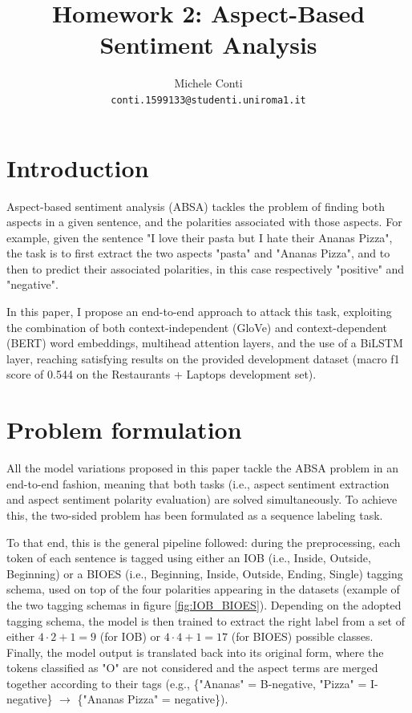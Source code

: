 \documentclass[11pt,a4paper]{article}
\title{Homework 2: Aspect-Based Sentiment Analysis}
\author{Michele Conti \\
	\texttt{conti.1599133@studenti.uniroma1.it}\\}
\date{}
\begin{document}
	\maketitle
	\section{Introduction}
	Aspect-based sentiment analysis (ABSA) tackles the problem of finding both aspects in a given sentence, and the polarities associated with those aspects. For example, given the sentence "I love their pasta but I hate their Ananas Pizza", the task is to first extract the two aspects "pasta" and "Ananas Pizza", and to then to predict their associated polarities, in this case respectively "positive" and "negative".
	
	In this paper, I propose an end-to-end approach to attack this task, exploiting the combination of both context-independent (GloVe) and context-dependent (BERT) word embeddings, multihead attention layers, and the use of a BiLSTM layer, reaching satisfying results on the provided development dataset (macro f1 score of 0.544 on the Restaurants + Laptops development set).
	
	\section{Problem formulation}
	All the model variations proposed in this paper tackle the ABSA problem in an end-to-end fashion, meaning that both tasks (i.e., aspect sentiment extraction and aspect sentiment polarity evaluation) are solved simultaneously. To achieve this, the two-sided problem has been formulated as a sequence labeling task. 
	
	To that end, this is the general pipeline followed: during the preprocessing, each token of each sentence is tagged using either an IOB (i.e., Inside, Outside, Beginning) or a BIOES (i.e., Beginning, Inside, Outside, Ending, Single) tagging schema, used on top of the four polarities appearing in the datasets (example of the two tagging schemas in figure \ref{fig:IOB_BIOES}). Depending on the adopted tagging schema, the model is then trained to extract the right label from a set of either  $4 \cdot 2 + 1 = 9$ (for IOB) or $4 \cdot 4 + 1 = 17$ (for BIOES) possible classes. Finally, the model output is translated back into its original form, where the tokens classified as "O" are not considered and the aspect terms are merged together according to their tags (e.g., \{"Ananas" = B-negative, "Pizza" = I-negative\} $\to$ \{"Ananas Pizza" = negative\}).
	
\end{document}
